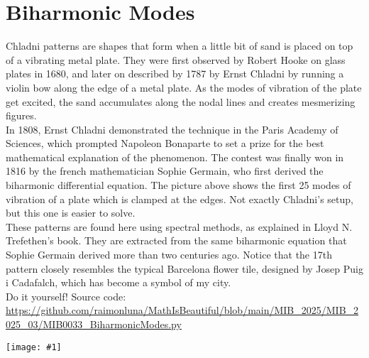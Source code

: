 \documentclass[12pt,landscape]{article}
\newcommand{\artpage}[3][]{%
  \begin{minipage}[t]{0.48\linewidth}
    \vspace{0pt} %
    \section*{#2} %
    \addcontentsline{toc}{section}{#2} %
    #3 %
  \end{minipage}%
  \hfill
  \begin{minipage}[t]{0.48\linewidth}
    \vspace{0pt} %
    \centering
    \texttt{[image: \#1]}
  \end{minipage}%
  \newpage
}
\begin{document}
\artpage[../Output/LowQuality/MIB0033_BiharmonicModes.png]{Biharmonic Modes}{%
Chladni patterns are shapes that form when a little bit of sand is placed on top of a vibrating metal plate. They were first observed by Robert Hooke on glass plates in 1680, and later on described by 1787 by Ernst Chladni by running a violin bow along the edge of a metal plate. As the modes of vibration of the plate get excited, the sand accumulates along the nodal lines and creates mesmerizing figures.\\

In 1808, Ernst Chladni demonstrated the technique in the Paris Academy of Sciences, which prompted Napoleon Bonaparte to set a prize for the best mathematical explanation of the phenomenon. The contest was finally won in 1816 by the french mathematician Sophie Germain, who first derived the biharmonic differential equation. The picture above shows the first 25 modes of vibration of a plate which is clamped at the edges. Not exactly Chladni's setup, but this one is easier to solve. \\

These patterns are found here using spectral methods, as explained in Lloyd N. Trefethen's book. They are extracted from the same biharmonic equation that Sophie Germain derived more than two centuries ago. Notice that the 17th pattern closely resembles the typical Barcelona flower tile, designed by Josep Puig i Cadafalch, which has become a symbol of my city.\\

Do it yourself! Source code: \url{https://github.com/raimonluna/MathIsBeautiful/blob/main/MIB_2025/MIB_2025_03/MIB0033_BiharmonicModes.py}
}
\end{document}
